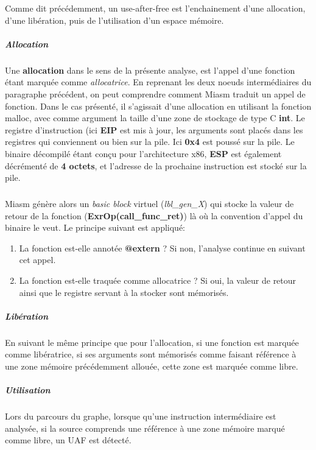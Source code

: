 Comme dit précédemment, un use-after-free est l'enchainement d'une allocation, d'une libération, puis de l'utilisation d'un espace mémoire.
\subparagraph{Allocation}
Une \textbf{allocation} dans le sens de la présente analyse, est l'appel d'une fonction étant marquée comme \textit{allocatrice}. En reprenant les deux noeuds intermédiaires
du paragraphe précédent, on peut comprendre comment Miasm traduit un appel de fonction. Dans le cas présenté, il s'agissait d'une allocation en utilisant la fonction malloc,
avec comme argument la taille d'une zone de stockage de type C \textbf{int}.
Le registre d'instruction (ici \textbf{EIP} est mis à jour, les arguments sont placés dans les registres qui conviennent ou bien sur la pile.
Ici \textbf{0x4} est poussé sur la pile. Le binaire décompilé étant conçu pour l'architecture x86, \textbf{ESP} est également décrémenté de \textbf{4 octets},
et l'adresse de la prochaine instruction est stocké sur la pile.
\subparagraph{}
Miasm génère alors un \textit{basic block} virtuel (\textit{lbl\_gen\_X}) qui stocke la valeur de retour de la fonction (\textbf{ExrOp(call\_func\_ret)})
là où la convention d'appel du binaire le veut. Le principe suivant est appliqué:
\begin{enumerate}
    \item La fonction est-elle annotée \textbf{@extern} ? Si non, l'analyse continue en suivant cet appel.
    \item La fonction est-elle traquée comme allocatrice ? Si oui, la valeur de retour ainsi que le registre servant à la stocker sont mémorisés.
\end{enumerate}

\subparagraph{Libération}
En suivant le même principe que pour l'allocation, si une fonction est marquée comme libératrice, si ses arguments sont mémorisés comme faisant référence
à une zone mémoire précédemment allouée, cette zone est marquée comme libre.

\subparagraph{Utilisation}
Lors du parcours du graphe, lorsque qu'une instruction intermédiaire est analysée, si la source comprends une référence à une zone mémoire marqué comme libre,
un UAF est détecté.

